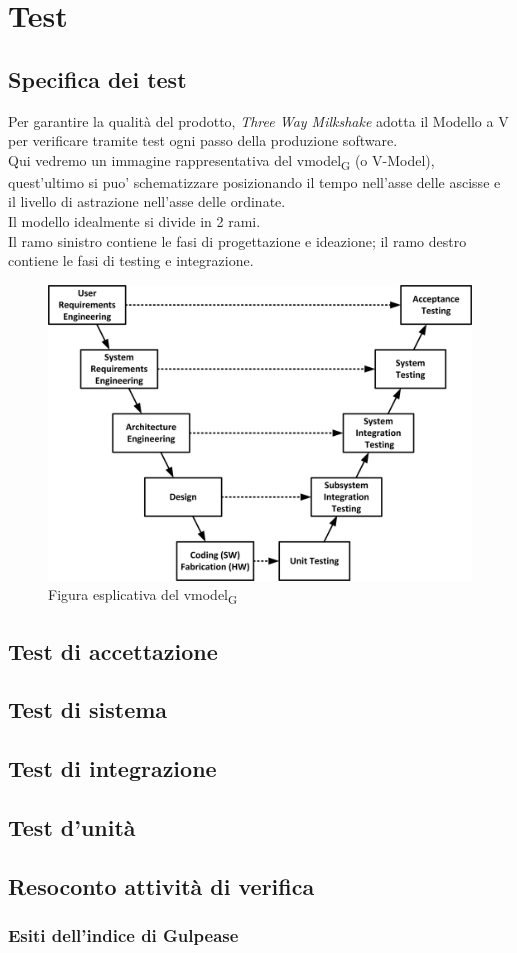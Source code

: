 \section{Test}

\subsection{Specifica dei test}

Per garantire la qualità del prodotto, \textit{Three Way Milkshake} adotta il Modello a V per verificare tramite test ogni passo della produzione software.\\Qui vedremo un immagine rappresentativa del \gls{vmodel}\textsubscript{G} (o V-Model), quest'ultimo si puo' schematizzare posizionando il tempo nell'asse delle ascisse e il livello di astrazione nell'asse delle ordinate.\\Il modello idealmente si divide in 2 rami.\\Il ramo sinistro contiene le fasi di progettazione e ideazione; il ramo destro contiene le fasi di testing e integrazione.
\begin{figure}[h!]
	\centering
	\includegraphics[scale=0.6]{res/images/v_model.jpg}
	\caption{Figura esplicativa del \gls{vmodel}\textsubscript{G}}
\end{figure}

\subsection{Test di accettazione}

\subsection{Test di sistema}

\subsection{Test di integrazione}

\subsection{Test d'unità}

\subsection{Resoconto attività di verifica}
\subsubsection{Esiti dell'indice di Gulpease}
